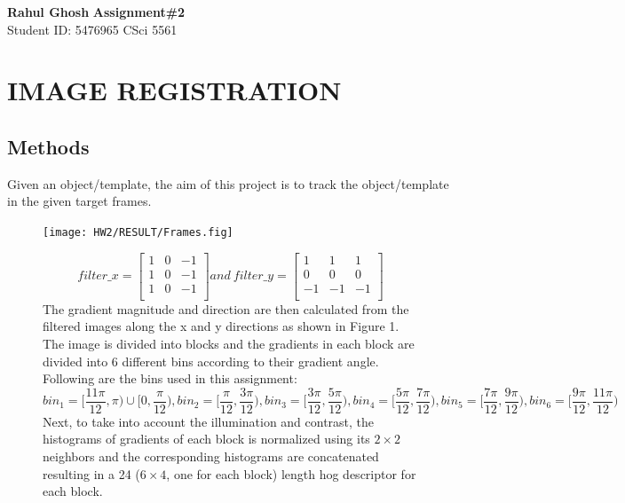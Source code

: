 \documentclass[letter, 10pt]{article}
\begin{document}
\noindent
\large \textbf{Rahul Ghosh} \hfill \textbf{Assignment\#2}\\
\normalsize Student ID: 5476965 \hfill CSci 5561\\

\section*{IMAGE REGISTRATION}
\subsection*{Methods}
Given an object/template, the aim of this project is to track the object/template in the given target frames.
\begin{figure}[!h]
    \centering
    \texttt{[image: HW2/RESULT/Frames.fig]}
    
\begin{equation*}
    filter\_x = \begin{bmatrix}
    1 & 0 & -1\\
    1 & 0 & -1\\
    1 & 0 & -1\\
    \end{bmatrix}
    and\ filter\_y = \begin{bmatrix}
    1 & 1 & 1\\
    0 & 0 & 0\\
    -1 & -1 & -1\\
    \end{bmatrix}
\end{equation*}
The gradient magnitude and direction are then calculated from the filtered images along the x and y directions as shown in Figure 1. The image is divided into blocks and the gradients in each block are divided into 6 different bins according to their gradient angle. Following are the bins used in this assignment:
\begin{equation*}
    bin_1 = [\frac{11\pi}{12}, \pi)\cup[0, \frac{\pi}{12}),
    bin_2 = [\frac{\pi}{12}, \frac{3\pi}{12}),
    bin_3 = [\frac{3\pi}{12}, \frac{5\pi}{12}),
    bin_4 = [\frac{5\pi}{12}, \frac{7\pi}{12}),
    bin_5 = [\frac{7\pi}{12}, \frac{9\pi}{12}),
    bin_6 = [\frac{9\pi}{12}, \frac{11\pi}{12})
\end{equation*}
Next, to take into account the illumination and contrast, the histograms of gradients of each block is normalized using its $2\times2$ neighbors and the corresponding histograms are concatenated resulting in a 24 ($6\times4$, one for each block) length hog descriptor for each block.


\end{figure}
\end{document}
